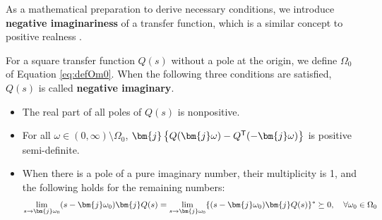 \documentclass[graybox, envcountchap]{svmult}
\begin{document}
As a mathematical preparation to derive necessary conditions, we introduce \textbf{negative imaginariness} of a transfer function, which is a similar concept to positive realness \cite{petersen2010feedback,xiong2010negative}.

\begin{definition}
\label{def:trni}
For a square transfer function $Q(s)$ without a pole at the origin, we define $\Omega_0$ of Equation \ref{eq:defOm0}.
When the following three conditions are satisfied, $Q(s)$ is called \textbf{negative imaginary}.
\begin{itemize}
\item The real part of all poles of $Q(s)$ is nonpositive.
\item For all $\omega \in (0,\infty)\setminus \Omega_0$, $\bm{j}\left\{Q(\bm{j} \omega) - Q^{\sf T}(-\bm{j} \omega) \right\}$ is positive semi-definite.
\item When there is a pole of a pure imaginary number, their multiplicity is 1, and the following holds for the remaining numbers:
\begin{align*}
\lim_{s \rightarrow \bm{j} \omega_0} (s-\bm{j} \omega_0) \bm{j} Q(s) = 
\lim_{s\rightarrow \bm{j} \omega_0} \{ (s-\bm{j} \omega_0) \bm{j} Q(s)\}^{\sf *}\succeq 0
,\quad
\forall \omega_0 \in \Omega_0
\end{align*}
\end{itemize}
\end{definition}
\end{document}
